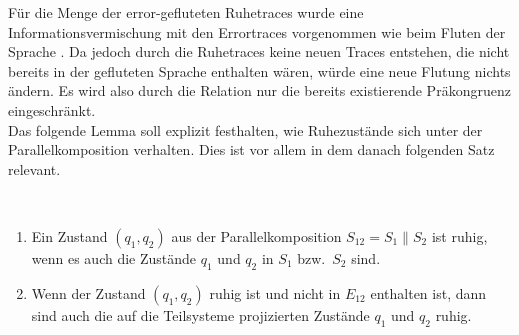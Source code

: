 Für die Menge der error-gefluteten Ruhetraces \QT{} wurde eine Informationsvermischung
mit den Errortraces vorgenommen wie beim Fluten der Sprache \EL{}. Da jedoch
durch die Ruhetraces keine neuen Traces entstehen, die nicht bereits in der
gefluteten Sprache \EL{} enthalten wären, würde eine neue Flutung nichts
ändern. Es wird also durch die Relation \QRel{} nur die
bereits existierende Präkongruenz \ERel{} eingeschränkt.\\
Das folgende Lemma soll explizit festhalten, wie Ruhezustände sich unter der
Parallelkomposition verhalten. Dies ist vor allem in dem danach folgenden Satz
relevant.

\begin{lem}
  \label{lemRuheParallelkomp}
  ~
  \begin{enumerate}
    \item Ein Zustand $(q_1,q_2)$ aus der Parallelkomposition $S_{12}=S_1\|S_2$
      ist ruhig, wenn es auch die Zustände $q_1$ und $q_2$ in $S_1$ bzw.\ $S_2$
      sind.
    \item Wenn der Zustand $(q_1,q_2)$ ruhig ist und nicht in $E_{12}$
      enthalten ist, dann sind auch die auf die Teilsysteme projizierten
      Zustände $q_1$ und $q_2$ ruhig.
  \end{enumerate}
\end{lem}

